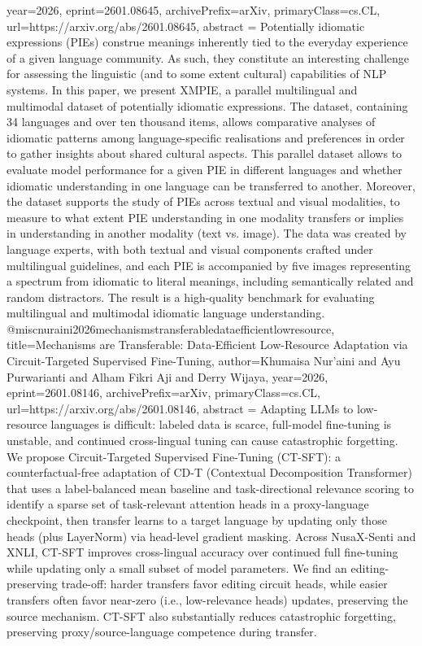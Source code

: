 {      year={2026},
      eprint={2601.08645},
      archivePrefix={arXiv},
      primaryClass={cs.CL},
      url={https://arxiv.org/abs/2601.08645},
      abstract = {Potentially idiomatic expressions (PIEs) construe meanings inherently tied to the everyday experience of a given language community. As such, they constitute an interesting challenge for assessing the linguistic (and to some extent cultural) capabilities of NLP systems. In this paper, we present XMPIE, a parallel multilingual and multimodal dataset of potentially idiomatic expressions. The dataset, containing 34 languages and over ten thousand items, allows comparative analyses of idiomatic patterns among language-specific realisations and preferences in order to gather insights about shared cultural aspects. This parallel dataset allows to evaluate model performance for a given PIE in different languages and whether idiomatic understanding in one language can be transferred to another. Moreover, the dataset supports the study of PIEs across textual and visual modalities, to measure to what extent PIE understanding in one modality transfers or implies in understanding in another modality (text vs. image). The data was created by language experts, with both textual and visual components crafted under multilingual guidelines, and each PIE is accompanied by five images representing a spectrum from idiomatic to literal meanings, including semantically related and random distractors. The result is a high-quality benchmark for evaluating multilingual and multimodal idiomatic language understanding.}
}@misc{nuraini2026mechanismstransferabledataefficientlowresource,
      title={Mechanisms are Transferable: Data-Efficient Low-Resource Adaptation via Circuit-Targeted Supervised Fine-Tuning}, 
      author={Khumaisa Nur'aini and Ayu Purwarianti and Alham Fikri Aji and Derry Wijaya},
      year={2026},
      eprint={2601.08146},
      archivePrefix={arXiv},
      primaryClass={cs.CL},
      url={https://arxiv.org/abs/2601.08146},
      abstract = {Adapting LLMs to low-resource languages is difficult: labeled data is scarce, full-model fine-tuning is unstable, and continued cross-lingual tuning can cause catastrophic forgetting. We propose Circuit-Targeted Supervised Fine-Tuning (CT-SFT): a counterfactual-free adaptation of CD-T (Contextual Decomposition Transformer) that uses a label-balanced mean baseline and task-directional relevance scoring to identify a sparse set of task-relevant attention heads in a proxy-language checkpoint, then transfer learns to a target language by updating only those heads (plus LayerNorm) via head-level gradient masking. Across NusaX-Senti and XNLI, CT-SFT improves cross-lingual accuracy over continued full fine-tuning while updating only a small subset of model parameters. We find an editing-preserving trade-off: harder transfers favor editing circuit heads, while easier transfers often favor near-zero (i.e., low-relevance heads) updates, preserving the source mechanism. CT-SFT also substantially reduces catastrophic forgetting, preserving proxy/source-language competence during transfer.}
}
